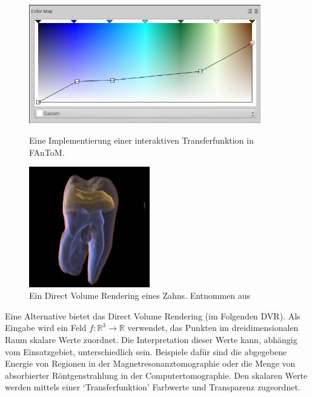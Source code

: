 \documentclass[a4paper,fontsize=12pt,toc=bib,halfparskip]{scrartcl}
\begin{document}
\begin{figure}
	\begin{minipage}{0.5\textwidth}
		\centering
		\includegraphics[width=0.9\textwidth]{pictures/Colormap.png}
		\caption{Eine Implementierung einer interaktiven Transferfunktion in FAnToM. }
		\label{Colormap}
	\end{minipage}
	\hspace{0.5cm}
	\begin{minipage}{0.5\textwidth}
		\centering
		\includegraphics[width=0.47\textwidth]{pictures/Zahn.png}
		\caption{Ein Direct Volume Rendering eines Zahns. Entnommen aus \cite[S.~6]{drebin1988volume}}
		\label{Zahn}
	\end{minipage}
\end{figure}
Eine Alternative bietet das Direct Volume Rendering\cite{drebin1988volume} (im Folgenden DVR). Als Eingabe wird ein Feld $f: \mathbb{R}^3\rightarrow\mathbb{R}$ verwendet, das Punkten im dreidimensionalen Raum skalare Werte zuordnet. Die Interpretation dieser Werte kann, abh\"angig vom Einsatzgebiet, unterschiedlich sein. Beispiele daf\"ur sind die abgegebene Energie von Regionen in der Magnetresonanztomographie oder die Menge von absorbierter R\"ontgenstrahlung in der Computertomographie. Den skalaren Werte werden mittels einer `Transferfunktion' Farbwerte und Transparenz zugeordnet.
\end{document}
